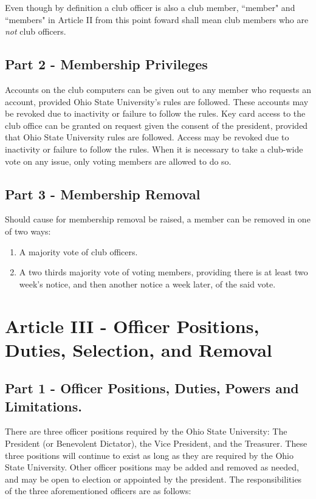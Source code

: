 \documentclass{article}
\begin{document}
Even though by definition a club officer is also a club member, ``member" and ``members" in Article II from this point foward shall mean club members who are \textit{not} club officers.

	\subsection{Part 2 - Membership Privileges}

	Accounts on the club computers can be given out to any member who requests an account, provided Ohio State University's rules are followed.  These accounts may be revoked due to inactivity or failure to follow the rules.  Key card access to the club office can be granted on request given the consent of the president, provided that Ohio State University rules are followed.  Access may be revoked due to inactivity or failure to follow the rules.
	When it is necessary to take a club-wide vote on any issue, only voting members are allowed to do so.

	\subsection{Part 3 - Membership Removal}

	Should cause for membership removal be raised, a member can be removed in one of two ways:
	\begin{enumerate}
		\item A majority vote of club officers.
		\item A two thirds majority vote of voting members, providing there is at least two week's notice, and then another notice a week later, of the said vote.
	\end{enumerate}

	\section{Article III - Officer Positions, Duties, Selection, and Removal}

	\subsection{Part 1 - Officer Positions, Duties, Powers and Limitations.}

	There are three officer positions required by the Ohio State University: The President (or Benevolent Dictator), the Vice President, and the Treasurer.  These three positions will continue to exist as long as they are required by the Ohio State University. Other officer positions may be added and removed as needed, and may be open to election or appointed by the president. The responsibilities of the three aforementioned officers are as follows:\\
\end{document}
